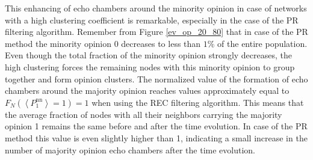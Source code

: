 \documentclass[11 pt , letterpaper , twoside , openright]{book}
\begin{document}
This enhancing of echo chambers around the minority opinion in case of networks with a high clustering coefficient is remarkable, especially in the case of the PR filtering algorithm. Remember from Figure \ref{ev_op_20_80} that in case of the PR method the minority opinion 0 decreases to less than $1 \%$ of the entire population. Even though the total fraction of the minority opinion strongly decreases, the high clustering forces the remaining nodes with this minority opinion to group together and form opinion clusters. The normalized value of the formation of echo chambers around the majority opinion reaches values approximately equal to $F_N(\left<P_1^{\text{nn}}\right> = 1) = 1$ when using the REC filtering algorithm. This means that the average fraction of nodes with all their neighbors carrying the majority opinion 1 remains the same before and after the time evolution. In case of the PR method this value is even slightly higher than 1, indicating a small increase in the number of majority opinion echo chambers after the time evolution. 
\end{document}

